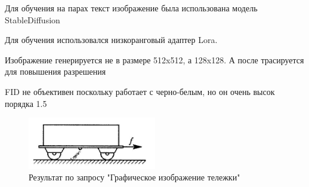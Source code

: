 Для обучения на парах текст изображение была использована модель StableDiffusion\cite{rombach2022highresolution}


Для обучения использовался низкоранговый адаптер Lora.


Изображение генерируется не в размере 512x512, а 128x128. А после трасируется для повышения разрешения


FID не объективен поскольку работает с черно-белым, но он очень высок порядка 1.5


\begin{figure}[h]
    \centering
    \includegraphics[width=0.5\textwidth]{assets/results/cart.jpg}
    \caption{Результат по запросу "Графическое изображение тележки"}
    \label{annotation}
\end{figure}

